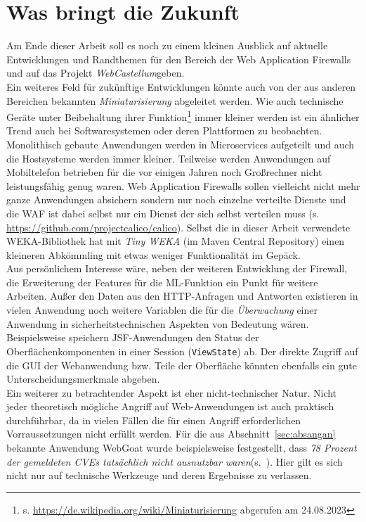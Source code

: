 \section{Was bringt die Zukunft}

Am Ende dieser Arbeit soll es noch zu einem kleinen Ausblick auf aktuelle Entwicklungen und Randthemen für den Bereich der Web Application Firewalls und auf das Projekt \glqq\emph{WebCastellum}\grqq geben.\\


Ein weiteres Feld für zukünftige Entwicklungen könnte auch von der aus anderen Bereichen bekannten \emph{Miniaturisierung} abgeleitet werden. Wie auch technische Geräte unter Beibehaltung ihrer Funktion\footnote{s. \url{https://de.wikipedia.org/wiki/Miniaturisierung} abgerufen am 24.08.2023} immer kleiner werden ist ein ähnlicher Trend auch bei Softwaresystemen oder deren Plattformen zu beobachten. Monolithisch gebaute Anwendungen werden in Microservices aufgeteilt und auch die Hostsysteme werden immer kleiner. Teilweise werden Anwendungen auf Mobiltelefon betrieben für die vor einigen Jahren noch Großrechner nicht leistungsfähig genug waren. Web Application Firewalls sollen vielleicht nicht mehr ganze Anwendungen absichern sondern nur noch einzelne verteilte Dienste und die WAF ist dabei selbst nur ein Dienst der sich selbst verteilen muss (s. \url{https://github.com/projectcalico/calico}). Selbst die in dieser Arbeit verwendete WEKA-Bibliothek hat mit \emph{Tiny WEKA} (im Maven Central Repository) einen kleineren Abkömmling mit etwas weniger Funktionalität im Gepäck.\\

Aus persönlichem Interesse wäre, neben der weiteren Entwicklung der Firewall, die Erweiterung der Features für die ML-Funktion ein Punkt für weitere Arbeiten. Außer den Daten aus den HTTP-Anfragen und Antworten existieren in vielen Anwendung noch weitere Variablen die für die \emph{Überwachung} einer Anwendung in sicherheitstechnischen Aspekten von Bedeutung wären. Beispielsweise speichern JSF-Anwendungen den Status der Oberflächenkomponenten in einer Session (\verb=ViewState=) ab. Der direkte Zugriff auf die GUI der Webanwendung bzw. Teile der Oberfläche könnten ebenfalls ein gute Unterscheidungsmerkmale abgeben.\\

Ein weiterer zu betrachtender Aspekt ist eher nicht-technischer Natur. Nicht jeder theoretisch mögliche Angriff auf Web-Anwendungen ist auch praktisch durchführbar, da in vielen Fällen die für einen Angriff erforderlichen Vorraussetzungen nicht erfüllt werden. Für die aus Abschnitt~\ref{sec:absangan} bekannte Anwendung WebGoat wurde beispielsweise festgestellt, dass \glqq\emph{78 Prozent der gemeldeten CVEs tatsächlich nicht ausnutzbar waren}\grqq (s.~\cite{lueck23}). Hier gilt es sich nicht nur auf technische Werkzeuge und deren Ergebnisse zu verlassen.\\

